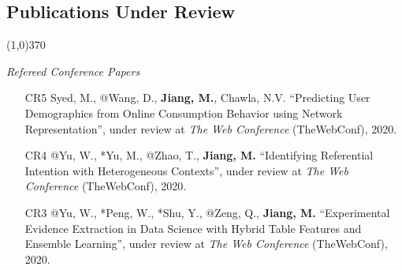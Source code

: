 \documentclass[10pt]{article}
\newenvironment{myindentpar}[1]%
{\begin{list}{}%
         {\setlength{\leftmargin}{#1}}%
         \item[]%
}
{\end{list}}
\newcounter{list}
\begin{document}
\subsection{\sc Publications Under Review}
\vspace{-0.4cm} \line(1,0){370} \vspace{-0.1cm}

\begin{myindentpar}{0.00cm}

\vspace{.2cm}\hspace{-0.25cm}\emph{Refereed Conference Papers}

\begin{enumerate}[leftmargin=.5cm]





\item[CR5] Syed, M., @Wang, D., \textbf{Jiang, M.}, Chawla, N.V. ``Predicting User Demographics from Online Consumption Behavior using Network Representation'', under review at \textit{The Web Conference} (TheWebConf), 2020.
		
\item[CR4] @Yu, W., *Yu, M., @Zhao, T., \textbf{Jiang, M.} ``Identifying Referential Intention with Heterogeneous Contexts'', under review at \textit{The Web Conference} (TheWebConf), 2020.

\item[CR3] @Yu, W., *Peng, W., *Shu, Y., @Zeng, Q., \textbf{Jiang, M.} ``Experimental Evidence Extraction in Data Science with Hybrid Table Features and Ensemble Learning'', under review at \textit{The Web Conference} (TheWebConf), 2020.


\end{enumerate}
\end{myindentpar}
\end{document}
